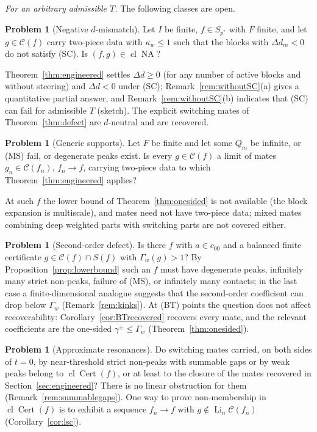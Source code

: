 \documentclass[10pt]{amsart}
\theoremstyle{definition}
\newtheorem{problem}[theorem]{Problem}
\theoremstyle{remark}
\newcommand{\NA}{\operatorname{NA}}
\newcommand{\Cset}{\mathcal C}
\newcommand{\Cert}{\operatorname{Cert}}
\newcommand{\Li}{\operatorname*{Li}}
\newcommand{\cl}{\operatorname{cl}}
\begin{document}
\emph{For an arbitrary admissible $T$.}  The following classes are open.

\begin{problem}[Negative $d$-mismatch]\label{prob:resonant}
Let $I$ be finite, $f\in S_{p^*}$ with $F$ finite, and let $g\in\Cset(f)$
carry two-piece data with $\kappa_w\le1$ such that the blocks with
$\Delta d_m<0$ do not satisfy \textup{(SC)}.  Is $(f,g)\in\cl\NA$?
\end{problem}

Theorem~\ref{thm:engineered} settles $\Delta d\ge0$ (for any number of
active blocks and without steering) and $\Delta d<0$ under \textup{(SC)};
Remark~\ref{rem:withoutSC}(a) gives a quantitative partial answer, and
Remark~\ref{rem:withoutSC}(b) indicates that \textup{(SC)} can fail for
admissible $T$ (sketch).  The explicit switching mates of
Theorem~\ref{thm:defect} are $d$-neutral and are recovered.

\begin{problem}[Generic supports]\label{prob:generic}
Let $F$ be finite and let some $Q_m$ be infinite, or \textup{(MS)} fail, or
degenerate peaks exist.  Is every $g\in\Cset(f)$ a limit of mates
$g_n\in\Cset(f_n)$, $f_n\to f$, carrying two-piece data to which
Theorem~\ref{thm:engineered} applies?
\end{problem}

At such $f$ the lower bound of Theorem~\ref{thm:onesided} is not available
(the block expansion is multiscale), and mates need not have two-piece data;
mixed mates combining deep weighted parts with switching parts are not
covered either.

\begin{problem}[Second-order defect]\label{prob:secondorder}
Is there $f$ with $a\in c_{00}$ and a balanced finite certificate
$g\in\Cset(f)\cap S(f)$ with $\Gamma_w(g)>1$?  By
Proposition~\ref{prop:lowerbound} such an $f$ must have degenerate peaks,
infinitely many strict non-peaks, failure of (MS), or infinitely many
contacts; in the last case a finite-dimensional analogue suggests that the
second-order coefficient can drop below $\Gamma_w$ (Remark~\ref{rem:kinks}).
At \textup{(BT)} points the question does not affect recoverability:
Corollary~\ref{cor:BTrecovered} recovers every mate, and the relevant
coefficients are the one-sided $\gamma^\pm\le\Gamma_w$
(Theorem~\ref{thm:onesided}).
\end{problem}

\begin{problem}[Approximate resonances]\label{prob:approx}
Do switching mates carried, on both sides of $t=0$, by near-threshold
strict non-peaks with summable gaps or by weak peaks belong to
$\cl\Cert(f)$, or at least to the closure of the mates recovered in
Section~\ref{sec:engineered}?  There is no linear obstruction for them
(Remark~\ref{rem:summablegaps}).  One way to prove non-membership in
$\cl\Cert(f)$ is to exhibit a sequence $f_n\to f$ with
$g\notin\Li_n\Cset(f_n)$ (Corollary~\ref{cor:lsc}).
\end{problem}
\end{document}

